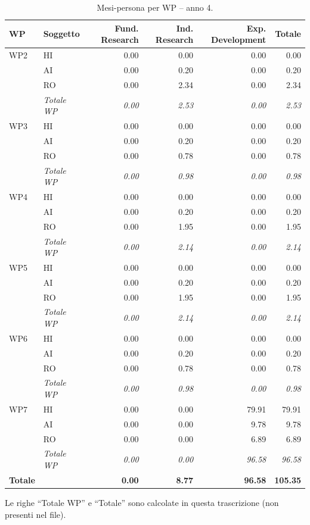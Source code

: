 \documentclass{plan4ari_report}
\begin{document}
\begin{table}[H]\centering\small\caption{Mesi-persona per WP -- anno 4.}\label{tab:wp-w-y4}
\begin{tabular}{llrrrr}\toprule\textbf{WP} & \textbf{Soggetto} & \textbf{Fund. Research} & \textbf{Ind. Research} & \textbf{Exp. Development} & \textbf{Totale} \\\midrule
WP2 & HI & 0.00 & 0.00 & 0.00 & 0.00 \\
 & AI & 0.00 & 0.20 & 0.00 & 0.20 \\
 & RO & 0.00 & 2.34 & 0.00 & 2.34 \\
 & \textit{Totale WP} & \textit{0.00} & \textit{2.53} & \textit{0.00} & \textit{2.53} \\\midrule
WP3 & HI & 0.00 & 0.00 & 0.00 & 0.00 \\
 & AI & 0.00 & 0.20 & 0.00 & 0.20 \\
 & RO & 0.00 & 0.78 & 0.00 & 0.78 \\
 & \textit{Totale WP} & \textit{0.00} & \textit{0.98} & \textit{0.00} & \textit{0.98} \\\midrule
WP4 & HI & 0.00 & 0.00 & 0.00 & 0.00 \\
 & AI & 0.00 & 0.20 & 0.00 & 0.20 \\
 & RO & 0.00 & 1.95 & 0.00 & 1.95 \\
 & \textit{Totale WP} & \textit{0.00} & \textit{2.14} & \textit{0.00} & \textit{2.14} \\\midrule
WP5 & HI & 0.00 & 0.00 & 0.00 & 0.00 \\
 & AI & 0.00 & 0.20 & 0.00 & 0.20 \\
 & RO & 0.00 & 1.95 & 0.00 & 1.95 \\
 & \textit{Totale WP} & \textit{0.00} & \textit{2.14} & \textit{0.00} & \textit{2.14} \\\midrule
WP6 & HI & 0.00 & 0.00 & 0.00 & 0.00 \\
 & AI & 0.00 & 0.20 & 0.00 & 0.20 \\
 & RO & 0.00 & 0.78 & 0.00 & 0.78 \\
 & \textit{Totale WP} & \textit{0.00} & \textit{0.98} & \textit{0.00} & \textit{0.98} \\\midrule
WP7 & HI & 0.00 & 0.00 & 79.91 & 79.91 \\
 & AI & 0.00 & 0.00 & 9.78 & 9.78 \\
 & RO & 0.00 & 0.00 & 6.89 & 6.89 \\
 & \textit{Totale WP} & \textit{0.00} & \textit{0.00} & \textit{96.58} & \textit{96.58} \\
\midrule\textbf{Totale} & & \textbf{0.00} & \textbf{8.77} & \textbf{96.58} & \textbf{105.35} \\
\bottomrule\end{tabular}
\par\smallskip\footnotesize Le righe ``Totale WP'' e ``Totale'' sono calcolate in questa trascrizione (non presenti nel file).
\end{table}
\end{document}
